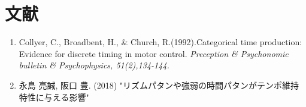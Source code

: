 \documentclass[twocolumn,10pt]{jarticle}
\begin{document}
\section{文献}
\begin{enumerate}
  \item Collyer, C., Broadbent, H., \& Church, R.(1992).Categorical time production: Evidence for discrete timing in motor control. {\it Preception \& Psychonomic bulletin \& Psychophysics, 51(2),134-144.}
  \item 永島 亮誠, 阪口 豊. (2018) "リズムパタンや強弱の時間パタンがテンポ維持特性に与える影響"
\end{enumerate}
\end{document}
